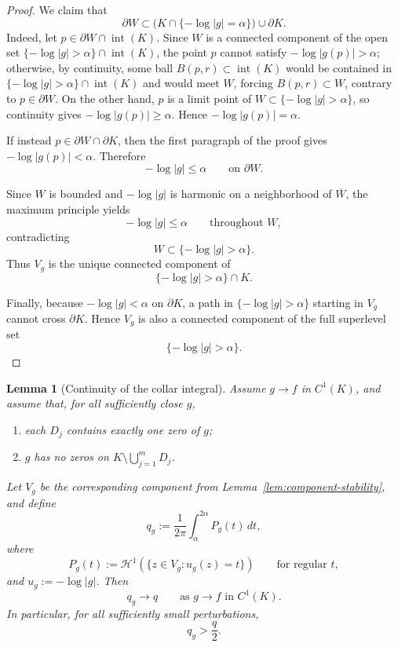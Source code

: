 \documentclass[12pt]{amsart}
\theoremstyle{definition}
\newtheorem{lemma}[theorem]{Lemma}
\theoremstyle{remark}
\begin{document}
\begin{proof}
We claim that
\[
\partial W \subset \bigl(K\cap\{-\log|g|=\alpha\}\bigr)\cup \partial K.
\]
Indeed, let $p\in \partial W\cap \operatorname{int}(K)$. Since $W$ is a connected
component of the open set $\{-\log|g|>\alpha\}\cap \operatorname{int}(K)$, the point $p$ cannot satisfy
$-\log|g(p)|>\alpha$; otherwise, by continuity, some ball $B(p,r)\subset \operatorname{int}(K)$
would be contained in $\{-\log|g|>\alpha\}\cap \operatorname{int}(K)$ and would meet $W$, forcing
$B(p,r)\subset W$, contrary to $p\in\partial W$. On the other hand, $p$ is a limit point
of $W\subset\{-\log|g|>\alpha\}$, so continuity gives $-\log|g(p)|\ge \alpha$. Hence
$-\log|g(p)|=\alpha$.

If instead $p\in \partial W\cap \partial K$, then the first paragraph of the proof gives
$-\log|g(p)|<\alpha$. Therefore
\[
-\log|g|\le \alpha \qquad \text{on }\partial W.
\]

Since $W$ is bounded and $-\log|g|$ is harmonic on a neighborhood of $\overline W$,
the maximum principle yields
\[
-\log|g|\le \alpha \qquad \text{throughout }W,
\]
contradicting
\[
W\subset \{-\log|g|>\alpha\}.
\]
Thus $V_g$ is the unique connected component of
\[
\{-\log|g|>\alpha\}\cap K.
\]

Finally, because $-\log|g|<\alpha$ on $\partial K$, a path in $\{-\log|g|>\alpha\}$
starting in $V_g$ cannot cross $\partial K$. Hence $V_g$ is also a connected component
of the full superlevel set
\[
\{-\log|g|>\alpha\}.
\]
\end{proof}

\medskip
\begin{lemma}[Continuity of the collar integral]\label{lem:collar-integral-continuity}
\emph{Assume $g\to f$ in $C^1(K)$, and assume that, for all sufficiently close $g$,}
\begin{enumerate}
\item[(a)] \emph{each $D_j$ contains exactly one zero of $g$;}
\item[(b)] \emph{$g$ has no zeros on $K\setminus \bigcup_{j=1}^m D_j$.}
\end{enumerate}
\emph{Let $V_g$ be the corresponding component from Lemma~\ref{lem:component-stability}, and define}
\[
q_g:=\frac1{2\pi}\int_\alpha^{2\alpha} P_g(t)\,dt,
\]
\emph{where}
\[
P_g(t):=\mathcal H^1(\{z\in V_g:u_g(z)=t\})
\qquad\text{for regular }t,
\]
\emph{and $u_g:=-\log|g|$. Then}
\[
q_g\to q
\qquad\text{as }g\to f\text{ in }C^1(K).
\]
\emph{In particular, for all sufficiently small perturbations,}
\[
q_g>\frac q2.
\]
\end{lemma}
\end{document}
